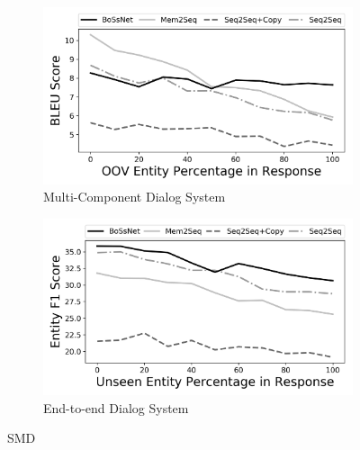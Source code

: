 \begin{figure}[!t]
\centering
\begin{subfigure}{0.8\textwidth}
 \includegraphics[width=\linewidth]{assets/graphs/smd_BLEU.png}
 \caption{Multi-Component Dialog System}\label{fig:systemfull}
\end{subfigure}

\vspace*{0.5in}

\begin{subfigure}{0.8\textwidth}
 \includegraphics[width=\linewidth]{assets/graphs/smd_F1.png}
 \caption{End-to-end Dialog System}\label{fig:end2end}
\end{subfigure}

\caption{SMD}
\end{figure}

\clearpage

